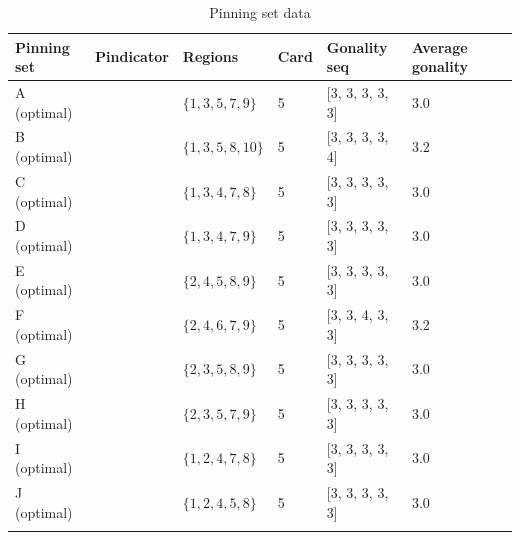 \documentclass{article}%
\begin{document}
\begin{table}[ht]
	\caption{Pinning set data}
	\centering
	\renewcommand{\arraystretch}{1.5}
	\begin{tabularx}{\textwidth}{lXXXXXX}
		\toprule
			Pinning set & Pindicator & Regions & Card & Gonality seq & Average gonality\\
			\hline
			A (optimal) & {\Huge\textcolor{red0}{\textbullet}} & $\{1,3,5,7,9\}$ & 5 & [3, 3, 3, 3, 3] & 3.0 \\
			B (optimal) & {\Huge\textcolor{red1}{\textbullet}} & $\{1,3,5,8,10\}$ & 5 & [3, 3, 3, 3, 4] & 3.2 \\
			C (optimal) & {\Huge\textcolor{red2}{\textbullet}} & $\{1,3,4,7,8\}$ & 5 & [3, 3, 3, 3, 3] & 3.0 \\
			D (optimal) & {\Huge\textcolor{red3}{\textbullet}} & $\{1,3,4,7,9\}$ & 5 & [3, 3, 3, 3, 3] & 3.0 \\
			E (optimal) & {\Huge\textcolor{red4}{\textbullet}} & $\{2,4,5,8,9\}$ & 5 & [3, 3, 3, 3, 3] & 3.0 \\
			F (optimal) & {\Huge\textcolor{red5}{\textbullet}} & $\{2,4,6,7,9\}$ & 5 & [3, 3, 4, 3, 3] & 3.2 \\
			G (optimal) & {\Huge\textcolor{red6}{\textbullet}} & $\{2,3,5,8,9\}$ & 5 & [3, 3, 3, 3, 3] & 3.0 \\
			H (optimal) & {\Huge\textcolor{red7}{\textbullet}} & $\{2,3,5,7,9\}$ & 5 & [3, 3, 3, 3, 3] & 3.0 \\
			I (optimal) & {\Huge\textcolor{red8}{\textbullet}} & $\{1,2,4,7,8\}$ & 5 & [3, 3, 3, 3, 3] & 3.0 \\
			J (optimal) & {\Huge\textcolor{red9}{\textbullet}} & $\{1,2,4,5,8\}$ & 5 & [3, 3, 3, 3, 3] & 3.0 \\
		\bottomrule \\ 
	\end{tabularx}
\end{table}

\newpage
\end{document}
